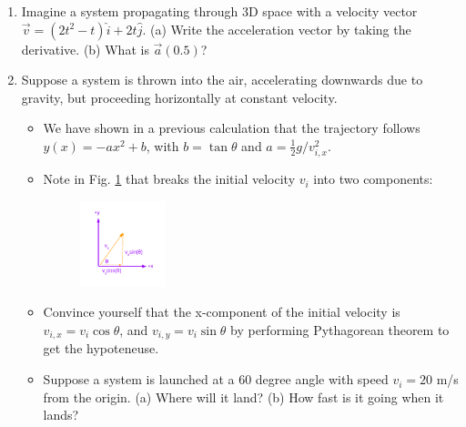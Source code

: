 \documentclass{article}
\begin{document}
\begin{enumerate}
\item Imagine a system propagating through 3D space with a velocity vector $\vec{v} = (2t^2-t)\hat{i} + 2t\hat{j}$.  (a) Write the acceleration vector by taking the derivative. (b) What is $\vec{a}(0.5)$? \\ \vspace{1cm}
\item Suppose a system is thrown into the air, accelerating downwards due to gravity, but proceeding horizontally at constant velocity.
\begin{itemize}
\item We have shown in a previous calculation that the trajectory follows $y(x) = -a x^2 + b$, with $b = \tan\theta$ and $a = \frac{1}{2} g/v_{i,x}^2$.
\item Note in Fig. \ref{fig:1} that breaks the initial velocity $v_i$ into two components:
\begin{figure}[ht]
\centering
\includegraphics[width=0.25\textwidth]{figures/Vectors1.pdf}
\caption{\label{fig:1}}
\end{figure}
\item Convince yourself that the x-component of the initial velocity is $v_{i,x} = v_i \cos\theta$, and $v_{i,y} = v_i \sin\theta$ by performing Pythagorean theorem to get the hypoteneuse. \\ \vspace{0.5cm}
\item Suppose a system is launched at a 60 degree angle with speed $v_i = 20$ m/s from the origin.  (a) Where will it land? (b) How fast is it going when it lands?
\end{itemize}
\end{enumerate}
\end{document}
